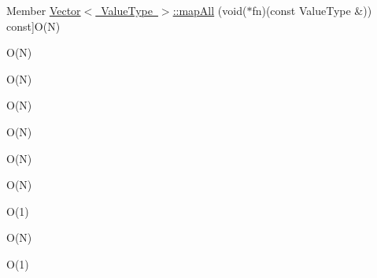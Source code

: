 \begin{DoxyRefList}
Member \mbox{\hyperlink{classVector_a395b81e6a77aa9702362198771785dfd}{Vector$<$ Value\+Type $>$\+:\+:map\+All}} (void($\ast$fn)(const Value\+Type \&)) const]O(\+N)  
\item[\label{BigOh__BigOh000119}%
\Hypertarget{BigOh__BigOh000119}%
Member \mbox{\hyperlink{classVector_a2931bda025b4800f128f37790d21f49f}{Vector$<$ Value\+Type $>$\+:\+:map\+All}} (void($\ast$fn)(Value\+Type)) const]O(\+N)  
\item[\label{BigOh__BigOh000121}%
\Hypertarget{BigOh__BigOh000121}%
Member \mbox{\hyperlink{classVector_a8dc32c1e45704cfae41daf8adb4e66dc}{Vector$<$ Value\+Type $>$\+:\+:map\+All}} (Functor\+Type fn) const]O(\+N)  
\item[\label{BigOh__BigOh000145}%
\Hypertarget{BigOh__BigOh000145}%
Member \mbox{\hyperlink{classVector_a3e96c4b5c89d1b00f587b521874cd0d8}{Vector$<$ Value\+Type $>$\+:\+:operator!=}} (const \mbox{\hyperlink{classVector}{Vector}} \&v2) const]O(\+N)  
\item[\label{BigOh__BigOh000139}%
\Hypertarget{BigOh__BigOh000139}%
Member \mbox{\hyperlink{classVector_acb70fcd67f846bf16b96223bcf43e476}{Vector$<$ Value\+Type $>$\+:\+:operator+}} (const \mbox{\hyperlink{classVector}{Vector}} \&v2) const]O(\+N)  
\item[\label{BigOh__BigOh000140}%
\Hypertarget{BigOh__BigOh000140}%
Member \mbox{\hyperlink{classVector_a2dce2988ba5880d744280b4bbf85b135}{Vector$<$ Value\+Type $>$\+:\+:operator+}} (std\+::initializer\+\_\+list$<$ Value\+Type $>$ list) const]O(\+N)  
\item[\label{BigOh__BigOh000141}%
\Hypertarget{BigOh__BigOh000141}%
Member \mbox{\hyperlink{classVector_a6b35f98e0e64a2fff6891a8806f640fd}{Vector$<$ Value\+Type $>$\+:\+:operator+=}} (const \mbox{\hyperlink{classVector}{Vector}} \&v2)]O(\+N)  
\item[\label{BigOh__BigOh000143}%
\Hypertarget{BigOh__BigOh000143}%
Member \mbox{\hyperlink{classVector_afded71b2a6d6df8b0257cbfd8f7e8d5f}{Vector$<$ Value\+Type $>$\+:\+:operator+=}} (const Value\+Type \&value)]O(1)  
\item[\label{BigOh__BigOh000142}%
\Hypertarget{BigOh__BigOh000142}%
Member \mbox{\hyperlink{classVector_a22e55ed53bfa2da64ecd22b36757fcea}{Vector$<$ Value\+Type $>$\+:\+:operator+=}} (std\+::initializer\+\_\+list$<$ Value\+Type $>$ list)]O(\+N)  
\item[\label{BigOh__BigOh000152}%
\Hypertarget{BigOh__BigOh000152}%
Member \mbox{\hyperlink{classVector_ad2a2f86bb5857209608bbbfe1066c650}{Vector$<$ Value\+Type $>$\+:\+:operator,}} (const Value\+Type \&value)]O(1)  

\end{DoxyRefList}

